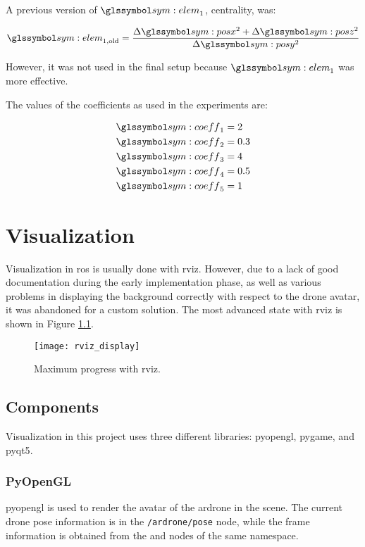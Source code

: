       A previous version of $\sym{elem}_1$, centrality, was:

      \begin{equation}
	\sym{elem}_{1,\mathrm{old}} = \frac{\Delta\sym{posx}^2 + \Delta\sym{posz}^2}{\Delta\sym{posy}^2}
      \end{equation}

      However, it was not used in the final setup because $\sym{elem}_1$ was more effective.  %

      The values of the coefficients as used in the experiments are:

      \begin{align*}
	\sym{coeff}_1 &= 2 \\
	\sym{coeff}_2 &= 0.3 \\
	\sym{coeff}_3 &= 4 \\
	\sym{coeff}_4 &= 0.5 \\
	\sym{coeff}_5 &= 1
      \end{align*}


\chapter{Visualization}
  Visualization in \gls{ros} is usually done with \gls{rviz}.
  However, due to a lack of good documentation during the early implementation phase, as well as various problems in displaying the background correctly with respect to the drone avatar, it was abandoned for a custom solution.
  The most advanced state with \gls{rviz} is shown in Figure \ref{fig:rviz_display}.

  \begin{figure}[h]
    \centering
    \texttt{[image: rviz\_display]}
    \caption[rviz maximum progress]{Maximum progress with \gls{rviz}.}
    \label{fig:rviz_display}
  \end{figure}

  \section{Components}
    Visualization in this project uses three different libraries: \gls{pyopengl}, \gls{pygame}, and \gls{pyqt5}.

    \subsection{PyOpenGL}
    \gls{pyopengl} is used to render the avatar of the \gls{ardrone} in the scene.
    The current drone pose information is in the \texttt{/ardrone/pose} node, while the frame information is obtained from the \texttt{} and \texttt{} nodes of the same namespace.

